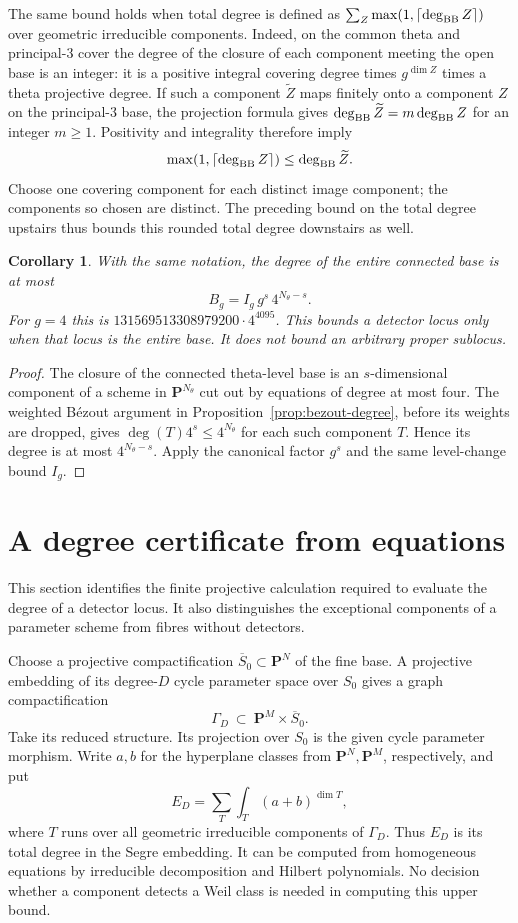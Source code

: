 \documentclass[11pt]{article}
\newtheorem{corollary}[theorem]{Corollary}
\theoremstyle{definition}
\theoremstyle{remark}
\begin{document}
The same bound holds when total degree is defined as
$\sum_Z\max(1,\lceil\deg_{\rm BB}Z\rceil)$ over geometric
irreducible components.  Indeed, on the common theta and
principal-$3$ cover the degree of the closure of each component
meeting the open base is an integer: it is a positive integral
covering degree times $g^{\dim Z}$ times a theta projective degree.
If such a component $\widetilde Z$ maps finitely onto a component
$Z$ on the principal-$3$ base, the projection formula gives
$\deg_{\rm BB}\widetilde Z=m\deg_{\rm BB}Z$ for an integer
$m\geq1$.  Positivity and integrality therefore imply
\[
 \max(1,\lceil\deg_{\rm BB}Z\rceil)
 \leq\deg_{\rm BB}\widetilde Z.
\]
Choose one covering component for each distinct image component;
the components so chosen are distinct.  The preceding bound on
the total degree upstairs thus bounds this rounded total degree
downstairs as well.


\begin{corollary}\label{cor:theta-degree-whole-base}
With the same notation, the degree of the entire connected base
is at most
\[
 B_g=I_g\,g^s\,4^{N_\theta-s}.
\]
For $g=4$ this is
$131569513308979200\cdot4^{4095}$.
This bounds a detector locus only when that locus is the entire
base.  It does not bound an arbitrary proper sublocus.
\end{corollary}
\begin{proof}
The closure of the connected theta-level base is an
$s$-dimensional component of a scheme in $\mathbf P^{N_\theta}$ cut out
by equations of degree at most four.  The weighted B\'ezout argument in
Proposition~\ref{prop:bezout-degree}, before its weights are dropped,
gives $\deg(T)4^s\leq4^{N_\theta}$ for each such component $T$.
Hence its degree is at most $4^{N_\theta-s}$.  Apply the canonical factor $g^s$
and the same level-change bound $I_g$.
\end{proof}

\section{A degree certificate from equations}
\label{sec:degree-certificate}

This section identifies the finite projective calculation required to
evaluate the degree of a detector locus.  It also distinguishes the
exceptional components of a parameter scheme from fibres without detectors.

Choose a projective compactification $\overline S_0\subset\mathbf P^N$
of the fine base.  A projective embedding of its degree-$D$ cycle
parameter space over $S_0$ gives a graph compactification
\[
 \Gamma_D\ \subset\ \mathbf P^M\times\overline S_0.
\]
Take its reduced structure.  Its projection over $S_0$ is the given
cycle parameter morphism.  Write $a,b$ for the hyperplane classes from
$\mathbf P^N,\mathbf P^M$, respectively, and put
\[
 E_D=\sum_{T}\int_T(a+b)^{\dim T},
\]
where $T$ runs over all geometric irreducible components of $\Gamma_D$.
Thus $E_D$ is its total degree in the Segre embedding.  It can be
computed from homogeneous equations by irreducible decomposition and
Hilbert polynomials.  No decision whether a component detects a Weil
class is needed in computing this upper bound.
\end{document}
